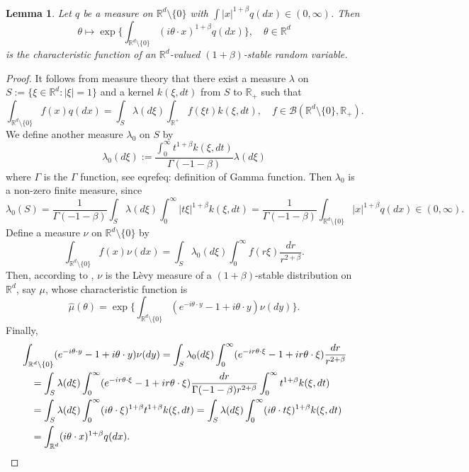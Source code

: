 \documentclass[12pt,a4paper]{amsart}
\theoremstyle{plain}
\newtheorem{lem}[thm]{Lemma}
\theoremstyle{definition}
\numberwithin{equation}{section}
\begin{document}
\begin{lem}
\label{lem: charactreisticfunction}
    Let $q$ be a measure on $\mathbb R^d\setminus\{0\}$ with $\int |x|^{1+\beta} q(dx) \in (0,\infty)$.
    Then $$\theta \mapsto  \exp\Big\{\int_{\mathbb R^d\setminus\{0\}} (i\theta \cdot x)^{1+\beta} q(dx)\Big\},\quad \theta \in \mathbb R^d$$
    is the characteristic function of an $\mathbb R^d$-valued $(1+\beta)$-stable random variable.
\end{lem}
\begin{proof}
It follows from measure theory that
    there exist a measure $\lambda$ on $S:= \{\xi\in \mathbb R^d:|\xi| = 1\}$ and a kernel $k(\xi,dt)$ from $S$ to $\mathbb R_+$ such that
\[
    \int_{\mathbb R^d\setminus \{0\}} f(x)q(dx) = \int_S \lambda(d\xi) \int_{\mathbb R^+} f(\xi t)k(\xi,dt),\quad
    f\in \mathcal B(\mathbb R^d\setminus \{0\}, \mathbb R_+).
\]
We define another measure $\lambda_0$ on $S$ by
\[
    \lambda_0(d\xi) := \frac{\int_0^\infty t^{1+\beta}k(\xi,dt)}{\Gamma(-1-\beta)} \lambda (d\xi)
\]
where $\Gamma$ is the $\Gamma$ function, see eqref{eq: definition of Gamma function}.
    Then $\lambda_0$ is a non-zero finite measure, since
\[
    \lambda_0(S) = \frac{1}{\Gamma(-1-\beta)} \int_S \lambda (d\xi) \int_0^\infty |t\xi|^{1+\beta}k(\xi,dt)
    = \frac{1}{\Gamma(-1-\beta)} \int_{\mathbb R^d\setminus\{0\}} |x|^{1+\beta} q(dx) \in (0,\infty).
\]
    Define a measure $\nu$ on $\mathbb R^d\setminus\{0\}$ by
\[
    \int_{\mathbb R^d\setminus\{0\}}f(x)\nu(dx)= \int_{S} \lambda_0(d\xi) \int_0^\infty f(r\xi) \frac{dr}{r^{2+\beta}} .
\]
    Then, according to \cite[Remark 14.4]{Sato1999Levy}, $\nu$ is the L\`evy measure of a $(1+\beta)$-stable distribution on $\mathbb R^d$, say $\mu$, whose characteristic function is \[\hat \mu(\theta)=\exp\Big\{\int_{\mathbb R^d\setminus\{0\}} (e^{-i\theta \cdot y}-1+i\theta \cdot y) \nu(dy)\Big\}.\]
	Finally,
\begin{equation}\begin{split}
    &\int_{\mathbb R^d\setminus\{0\}} (e^{-i\theta \cdot y}-1+i\theta \cdot y) \nu(dy)
    = \int_S \lambda_0(d\xi) \int_0^\infty (e^{-ir\theta \cdot \xi}-1+ir\theta \cdot \xi) \frac{dr}{r^{2+\beta}}
\\&\quad = \int_S \lambda (d\xi) \int_0^\infty (e^{-ir\theta \cdot \xi}-1+ir\theta \cdot \xi) \frac{dr}{\Gamma(-1-\beta)r^{2+\beta}}\int_0^\infty t^{1+\beta} k(\xi,dt)
\\&\quad = \int_S \lambda (d\xi) \int_0^\infty (i\theta\cdot \xi)^{1+\beta} t^{1+\beta} k(\xi,dt)
= \int_S \lambda(d\xi) \int_0^\infty (i\theta \cdot t\xi)^{1+\beta} k(\xi,dt)
\\&\quad = \int_{\mathbb R^d} (i\theta \cdot x)^{1+\beta} q(dx).
\qedhere
\end{split}\end{equation}
\end{proof}
\end{document}
